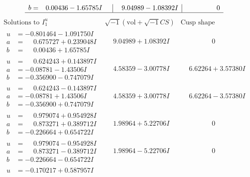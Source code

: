 \documentclass[1p]{elsarticle_modified}
\theoremstyle{definition}
\newcommand{\I}{\sqrt{-1}}
\begin{document}
$$\begin{array}{c|c|c}
\begin{aligned}
b &= \phantom{-}0.00436 - 1.65785 I\end{aligned}
 & \phantom{-}9.04989 - 1.08392 I & \phantom{-0.000000 } 0\\
 \hline 
 \end{array}$$\newpage$$\begin{array}{c|c|c}  
\text{Solutions to }I^u_{1}& \I (\text{vol} + \sqrt{-1}CS) & \text{Cusp shape}\\
 \hline 
\begin{aligned}
u &= -0.801464 - 1.091750 I \\
a &= \phantom{-}0.675727 + 0.239048 I \\
b &= \phantom{-}0.00436 + 1.65785 I\end{aligned}
 & \phantom{-}9.04989 + 1.08392 I & \phantom{-0.000000 } 0 \\ \hline\begin{aligned}
u &= \phantom{-}0.624243 + 0.143897 I \\
a &= -0.08781 - 1.43506 I \\
b &= -0.356900 - 0.747079 I\end{aligned}
 & \phantom{-}4.58359 - 3.00778 I & \phantom{-}6.62264 + 3.57380 I \\ \hline\begin{aligned}
u &= \phantom{-}0.624243 - 0.143897 I \\
a &= -0.08781 + 1.43506 I \\
b &= -0.356900 + 0.747079 I\end{aligned}
 & \phantom{-}4.58359 + 3.00778 I & \phantom{-}6.62264 - 3.57380 I \\ \hline\begin{aligned}
u &= \phantom{-}0.979074 + 0.954928 I \\
a &= \phantom{-}0.873271 + 0.389712 I \\
b &= -0.226664 + 0.654722 I\end{aligned}
 & \phantom{-}1.98964 + 5.22706 I & \phantom{-0.000000 } 0 \\ \hline\begin{aligned}
u &= \phantom{-}0.979074 - 0.954928 I \\
a &= \phantom{-}0.873271 - 0.389712 I \\
b &= -0.226664 - 0.654722 I\end{aligned}
 & \phantom{-}1.98964 - 5.22706 I & \phantom{-0.000000 } 0 \\ \hline\begin{aligned}
u &= -0.170217 + 0.587957 I \\

\end{aligned}
\end{array}$$
\end{document}
